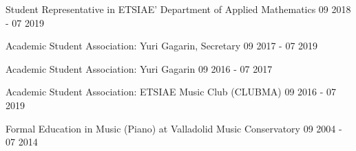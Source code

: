 Student Representative in ETSIAE' Department of Applied Mathematics	\hfill 09 2018 - 07 2019

Academic Student Association: Yuri Gagarin, Secretary	\hfill 09 2017 - 07 2019

Academic Student Association: Yuri Gagarin	\hfill 09 2016 - 07 2017

Academic Student Association: ETSIAE Music Club (CLUBMA)	\hfill 09 2016 - 07 2019

Formal Education in Music (Piano)  at Valladolid Music Conservatory \hfill 09 2004 - 07 2014

